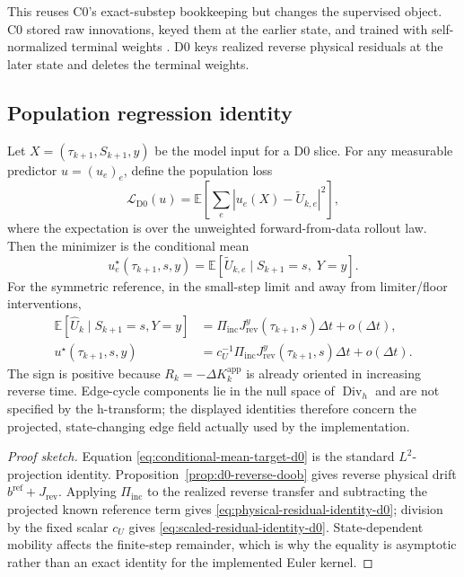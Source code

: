 \documentclass[11pt]{article}
\numberwithin{equation}{section}
\newcommand{\E}{\mathbb E}
\newcommand{\dive}{\operatorname{Div}_h}
\newcommand{\1}{\mathbf 1}
\begin{document}
This reuses C0's exact-substep bookkeeping but changes the supervised object.  C0 stored raw innovations, keyed them at the earlier state, and trained with self-normalized terminal weights \cite[Secs.~8--11]{c0-note}.  D0 keys realized reverse physical residuals at the later state and deletes the terminal weights.

\subsection{Population regression identity}

Let \(X=(\tau_{k+1},S_{k+1},y)\) be the model input for a D0 slice.  For any measurable predictor \(u=(u_e)_e\), define the population loss
\begin{equation}\label{eq:population-d0-loss}
  \mathcal L_{\mathrm{D0}}(u)=
  \E\left[\sum_e |u_e(X)-\widetilde U_{k,e}|^2\right],
\end{equation}
where the expectation is over the unweighted forward-from-data rollout law.  Then the minimizer is the conditional mean
\begin{equation}\label{eq:conditional-mean-target-d0}
  u_e^\star(\tau_{k+1},s,y)=\E\left[\widetilde U_{k,e}\mid S_{k+1}=s,\;Y=y\right].
\end{equation}
For the symmetric reference, in the small-step limit and away from limiter/floor interventions,
\begin{align}
  \E[\widehat U_k\mid S_{k+1}=s,Y=y]
  &=\Pi_{\mathrm{inc}}J_{\mathrm{rev}}^y(\tau_{k+1},s)\Delta t+o(\Delta t),
  \label{eq:physical-residual-identity-d0}\\
  u^\star(\tau_{k+1},s,y)
  &=c_U^{-1}\Pi_{\mathrm{inc}}J_{\mathrm{rev}}^y(\tau_{k+1},s)\Delta t+o(\Delta t).
  \label{eq:scaled-residual-identity-d0}
\end{align}
The sign is positive because \(R_k=-\Delta K_k^{\mathrm{app}}\) is already oriented in increasing reverse time.  Edge-cycle components lie in the null space of \(\dive\) and are not specified by the h-transform; the displayed identities therefore concern the projected, state-changing edge field actually used by the implementation.

\begin{proof}[Proof sketch]
Equation \eqref{eq:conditional-mean-target-d0} is the standard \(L^2\)-projection identity.  Proposition~\ref{prop:d0-reverse-doob} gives reverse physical drift \(b^{\mathrm{ref}}+J_{\mathrm{rev}}\).  Applying \(\Pi_{\mathrm{inc}}\) to the realized reverse transfer and subtracting the projected known reference term gives \eqref{eq:physical-residual-identity-d0}; division by the fixed scalar \(c_U\) gives \eqref{eq:scaled-residual-identity-d0}.  State-dependent mobility affects the finite-step remainder, which is why the equality is asymptotic rather than an exact identity for the implemented Euler kernel.
\end{proof}
\end{document}
